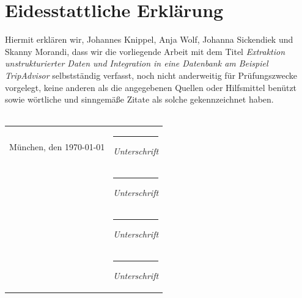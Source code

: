 \documentclass[a4paper,oneside,12pt]{report}
\begin{document}
	\chapter*{Eidesstattliche Erklärung}
		Hiermit erklären wir, Johannes Knippel, Anja Wolf, Johanna Sickendiek und Skanny Morandi, dass wir die vorliegende Arbeit mit dem Titel \textit{Extraktion unstrukturierter Daten und Integration in eine Datenbank am Beispiel TripAdvisor} selbstständig verfasst, noch nicht anderweitig für Prüfungszwecke vorgelegt, keine anderen als die angegebenen Quellen oder Hilfsmittel benützt sowie wörtliche und sinngemäße Zitate als solche gekennzeichnet haben.
		\vspace{15mm}
		\\
		\\
		\begin{flushleft}
			\begin{tabular}[H]{ll}
				
				München, den \parbox{5,5cm}{\today}  	& 	\parbox{6cm}{\hrule\medskip \textit{Unterschrift}}\\[2cm]
													  	& 	\parbox{6cm}{\hrule\medskip \textit{Unterschrift}}\\[2cm]
													  	& 	\parbox{6cm}{\hrule\medskip \textit{Unterschrift}}\\[2cm]
													  	& 	\parbox{6cm}{\hrule\medskip \textit{Unterschrift}}\\[2cm]
			\end{tabular}
		\end{flushleft}
\end{document}
